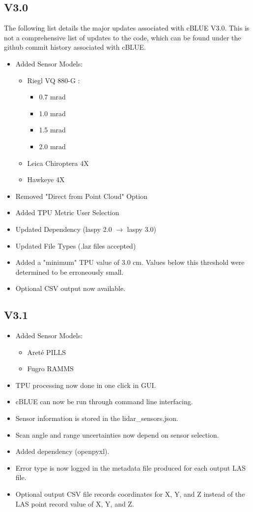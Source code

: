 \documentclass[11pt, a4paper]{article}
\begin{document}
\subsection{V3.0}
The following list details the major updates associated with cBLUE V3.0. This is not a comprehensive list of updates to the code, which can be found under the github commit history associated with cBLUE.
\begin{itemize}
    \item Added Sensor Models:
    \begin{itemize}
        \item Riegl VQ 880-G :
        \begin{itemize}
            \item 0.7 mrad
            \item 1.0 mrad
            \item 1.5 mrad
            \item 2.0 mrad
        \end{itemize}
        \item Leica Chiroptera 4X
        \item Hawkeye 4X
    \end{itemize}
    \item Removed "Direct from Point Cloud" Option
    \item Added TPU Metric User Selection
    \item Updated Dependency (laspy 2.0 $\rightarrow$ laspy 3.0)
    \item Updated File Types (.laz files accepted)
    \item Added a "minimum" TPU value of 3.0 cm. Values below this threshold were determined to be erroneously small.
    \item Optional CSV output now available.
\end{itemize}

\subsection{V3.1}
\begin{itemize}
    \item Added Sensor Models:
    \begin{itemize}
        \item Areté PILLS
        \item Fugro RAMMS
    \end{itemize}
    \item TPU processing now done in one click in GUI.
    \item cBLUE can now be run through command line interfacing.
    \item Sensor information is stored in the lidar\_sensors.json.
    \item Scan angle and range uncertainties now depend on sensor selection.
    \item Added dependency (openpyxl).
    \item Error type is now logged in the metadata file produced for each output LAS file.
    \item Optional output CSV file records coordinates for X, Y, and Z instead of the LAS point record value of X, Y, and Z.  
\end{itemize}
\end{document}
